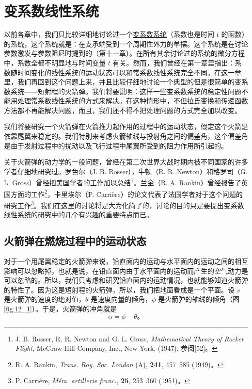 
\chapter{变系数线性系统}

以前各章中，我们只比较详细地讨论过一个\underline{变系数系统}（系数也是时间 $t$ 的函数）的系统，这个系统就是：在支承端受到一个周期性外力的单摆。这个系统是在讨论参数激发与参数阻尼时提到的（第十一章）。在所有其余讨论过的系统的微分方程中，系数全都不明显地与时间变量 $t$ 有关。然而，我们曾经在第一章里指出：系数随时间变化的线性系统的运动状态可以和常系数线性系统完全不同。在这一章里，我们再回到这个问题上来，并且比较仔细地讨论一个典型的但是很简单的变系数系统——短射程的火箭弹。我们将要说明：这样一些变系数系统的稳定性问题不能用处理常系数线性系统的方式来解决。在这种情形中，不但拉氏变换和传递函数方法都不再能解决问题，而且，我们还不得不把处理问题的方式完全加以改变。

我们将要研究一个火箭弹在火箭推力起作用的过程中的运动状态，假定这个火箭是依靠尾翼来稳定的。我们特别来考虑火箭轴线与投射角之间的偏差角，这个偏差角是由于发射过程中的扰动以及飞行过程中尾翼所受到的阻力作用所引起的。

关于火箭弹的动力学的一般问题，曾经在第二次世界大战时期内被不同国家的许多学者仔细地研究过。罗色尔（J. B. Rosser），牛顿（R. R. Newton）和格罗司（G. L. Gross）曾经把美国学者的工作加以总结\footnote{J. B. Rosser, R. R. Newton and G. L. Gross, \textit{Mathematical Theory of Rocket Flight}, McGraw-Hill Company, Inc., New York, (1947), 参阅[52]。}。兰金（R. A. Rankin）曾经报告了英国方面的工作\footnote{R. A. Rankin, \textit{Trans. Roy. Soc. London} (A), \textbf{241}, 457~585 (1949)。}，卡里埃尔（P. Carrière）的论文代表了法国学者对于这个问题的研究工作\footnote{P. Carrière, \textit{Mém. artillerie franc.}, \textbf{25}, 253~360 (1951)。}。我们在这里的讨论将是大为化简了的，讨论的目的只是要提出变系数线性系统的研究中的几个有兴趣的重要特点而已。

\section{火箭弹在燃烧过程中的运动状态}

对于一个用尾翼稳定的火箭弹来说，铅直面内的运动与水平面内的运动之间的相互影响可以忽略掉，也就是说，在铅直面内由于水平面内的运动而产生的空气动力是可以忽略的。所以，我们只考虑和研究铅直面内的运动情况，也就能够知道火箭弹的特性了。因为这是短射程的火箭弹，所以，我们把地面看成是一个平面。设 $v$ 是火箭弹的速度的绝对值，$\theta$ 是速度向量的倾角，$\phi$ 是火箭弹的轴线的倾角（图\ref{fig:12_1}）。于是，火箭弹的冲角就是
\begin{equation}\label{eq:ch12_attack_angle}
\alpha = \phi - \theta。
\end{equation}

